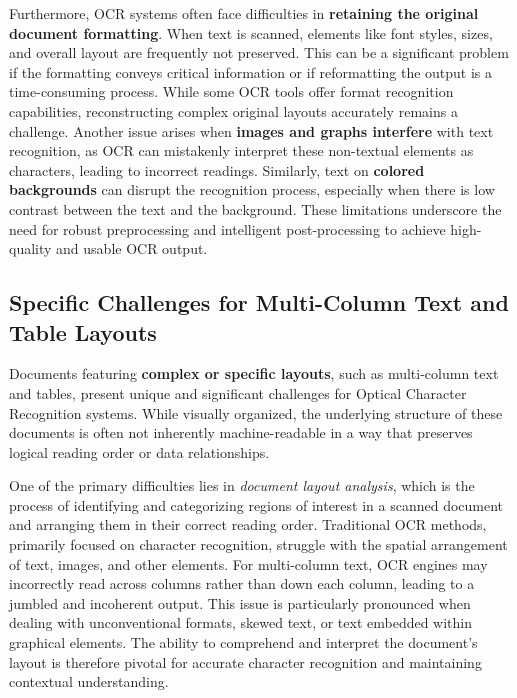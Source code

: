 Furthermore, OCR systems often face difficulties in \textbf{retaining the original document formatting}. When text is scanned, elements like font styles, sizes, and overall layout are frequently not preserved. \cite{DocuclipperLimitations} This can be a significant problem if the formatting conveys critical information or if reformatting the output is a time-consuming process. While some OCR tools offer format recognition capabilities, reconstructing complex original layouts accurately remains a challenge. \cite{DocuclipperLimitations} Another issue arises when \textbf{images and graphs interfere} with text recognition, as OCR can mistakenly interpret these non-textual elements as characters, leading to incorrect readings. \cite{DocuclipperLimitations} Similarly, text on \textbf{colored backgrounds} can disrupt the recognition process, especially when there is low contrast between the text and the background. \cite{DocuclipperLimitations} These limitations underscore the need for robust preprocessing and intelligent post-processing to achieve high-quality and usable OCR output.

\subsection{Specific Challenges for Multi-Column Text and Table Layouts}

Documents featuring \textbf{complex or specific layouts}, such as multi-column text and tables, present unique and significant challenges for Optical Character Recognition systems. While visually organized, the underlying structure of these documents is often not inherently machine-readable in a way that preserves logical reading order or data relationships.

One of the primary difficulties lies in \emph{document layout analysis}, which is the process of identifying and categorizing regions of interest in a scanned document and arranging them in their correct reading order. \cite{WikipediaLayoutAnalysis, MediumLayoutLMv3} Traditional OCR methods, primarily focused on character recognition, struggle with the spatial arrangement of text, images, and other elements. \cite{MediumLayoutLMv3} For multi-column text, OCR engines may incorrectly read across columns rather than down each column, leading to a jumbled and incoherent output. \cite{UWDocInfo} This issue is particularly pronounced when dealing with unconventional formats, skewed text, or text embedded within graphical elements. \cite{DocuclipperLimitations, WikipediaLayoutAnalysis} The ability to comprehend and interpret the document's layout is therefore pivotal for accurate character recognition and maintaining contextual understanding. \cite{MediumLayoutLMv3}


